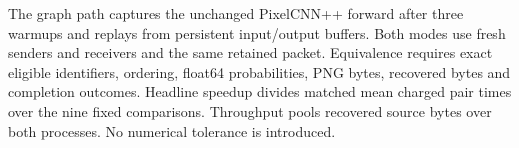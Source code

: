 The graph path captures the unchanged PixelCNN++ forward after three warmups and replays from persistent input/output buffers. Both modes use fresh senders and receivers and the same retained packet. Equivalence requires exact eligible identifiers, ordering, float64 probabilities, PNG bytes, recovered bytes and completion outcomes. Headline speedup divides matched mean charged pair times over the nine fixed comparisons. Throughput pools recovered source bytes over both processes. No numerical tolerance is introduced.
